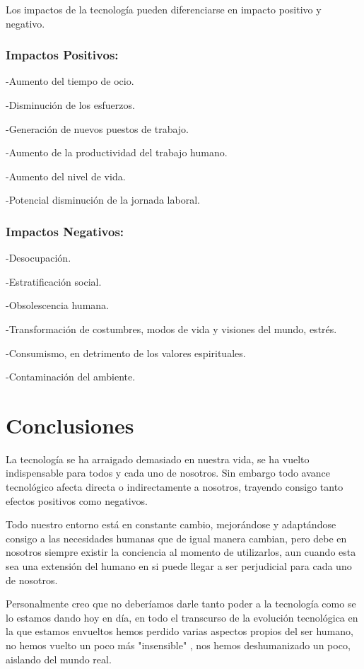 \documentclass{bmcart}
\begin{document}
Los impactos de la tecnología pueden diferenciarse en impacto positivo y negativo.\smallskip

\subsubsection*{Impactos Positivos:}
\smallskip
-Aumento del tiempo de ocio.\smallskip

-Disminución de los esfuerzos.\smallskip

-Generación de nuevos puestos de trabajo.\smallskip

-Aumento de la productividad del trabajo humano.\smallskip

-Aumento del nivel de vida.\smallskip

-Potencial disminución de la jornada laboral.\smallskip 

\subsubsection*{Impactos Negativos:}
\smallskip
-Desocupación.\smallskip

-Estratificación social.\smallskip

-Obsolescencia humana.\smallskip

-Transformación de costumbres, modos de vida y visiones del mundo, estrés.\smallskip

-Consumismo, en detrimento de los valores espirituales.\smallskip

-Contaminación del ambiente.\smallskip

\section*{Conclusiones}
La tecnología se ha arraigado demasiado en nuestra vida, se ha vuelto indispensable para todos y cada uno de nosotros. Sin embargo todo avance tecnológico afecta directa o indirectamente a nosotros, trayendo consigo tanto efectos positivos como negativos.\smallskip

Todo nuestro entorno está en constante cambio, mejorándose y adaptándose consigo a las necesidades humanas que de igual manera cambian, pero debe en nosotros siempre existir la conciencia al momento de utilizarlos, aun cuando esta sea una extensión del humano en si puede llegar a ser perjudicial para cada uno de nosotros.\smallskip

Personalmente creo que no deberíamos darle tanto poder a la tecnología como se lo estamos dando hoy en día, en todo el transcurso de la evolución tecnológica en la que estamos envueltos hemos perdido varias aspectos propios del ser humano, no hemos vuelto un poco más "insensible" , nos hemos deshumanizado un poco, aislando del mundo real.
\end{document}
